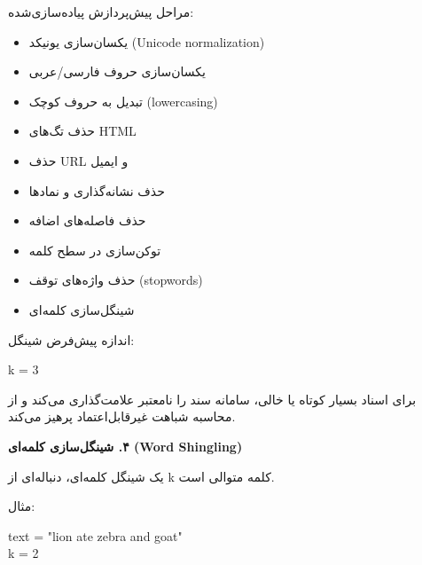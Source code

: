 \documentclass[11pt]{article}
\begin{document}
\noindent ‏مراحل پیش‌پردازش پیاده‌سازی‌شده:\par

\begin{itemize}

\item ‏یکسان‌سازی یونیکد (Unicode normalization)

\item ‏یکسان‌سازی حروف فارسی/عربی

\item ‏تبدیل به حروف کوچک (lowercasing)

\item ‏حذف تگ‌های HTML

\item ‏حذف URL و ایمیل

\item ‏حذف نشانه‌گذاری و نمادها

\item ‏حذف فاصله‌های اضافه

\item ‏توکن‌سازی در سطح کلمه

\item ‏حذف واژه‌های توقف (stopwords)

\item ‏شینگل‌سازی کلمه‌ای

\end{itemize}

\noindent ‏اندازه پیش‌فرض شینگل:\par

{\mycode
\begin{flushleft}
k = 3
\end{flushleft}}

\noindent ‏برای اسناد بسیار کوتاه یا خالی، سامانه سند را نامعتبر علامت‌گذاری می‌کند و از محاسبه شباهت غیرقابل‌اعتماد پرهیز می‌کند.\par

\medskip\noindent\hrulefill\medskip

\medskip
{\large\bfseries ‏۴. شینگل‌سازی کلمه‌ای (Word Shingling)}\medskip


\noindent ‏یک شینگل کلمه‌ای، دنباله‌ای از k کلمه متوالی است.\par

\noindent ‏مثال:\par

{\mycode
\begin{flushleft}
text = "lion ate zebra and goat" \\
k = 2
\end{flushleft}}
\end{document}
